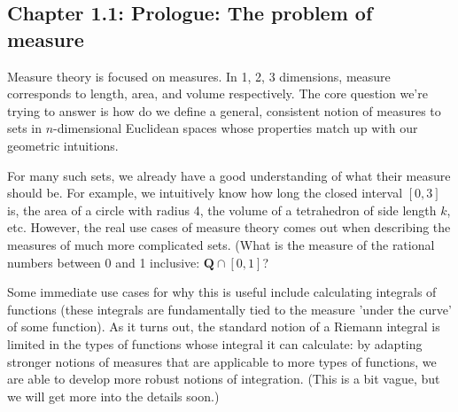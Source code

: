 \documentclass[answers,12pt]{exam}
\begin{document}
\subsection{Chapter 1.1: Prologue: The problem of measure}
Measure theory is focused on measures. 
In 1, 2, 3 dimensions, measure corresponds to length, area, and volume respectively.
The core question we're trying to answer is how do we define a general, consistent notion of measures to sets in $n$-dimensional Euclidean spaces whose properties match up with our geometric intuitions.

For many such sets, we already have a good understanding of what their measure should be.
For example, we intuitively know how long the closed interval $[0,3]$ is, the area of a circle with radius 4, the volume of a tetrahedron of side length $k$, etc.
However, the real use cases of measure theory comes out when describing the measures of much more complicated sets. (What is the measure of the rational numbers between 0 and 1 inclusive: $\mathbf{Q} \cap [0,1]$? 

Some immediate use cases for why this is useful include calculating integrals of functions (these integrals are fundamentally tied to the measure 
'under the curve' of some function).
As it turns out, the standard notion of a Riemann integral is limited in the types of functions whose integral it can calculate: by adapting stronger notions of measures that are applicable to more types of functions, we are able to develop more robust notions of integration.
(This is a bit vague, but we will get more into the details soon.)
\end{document}
